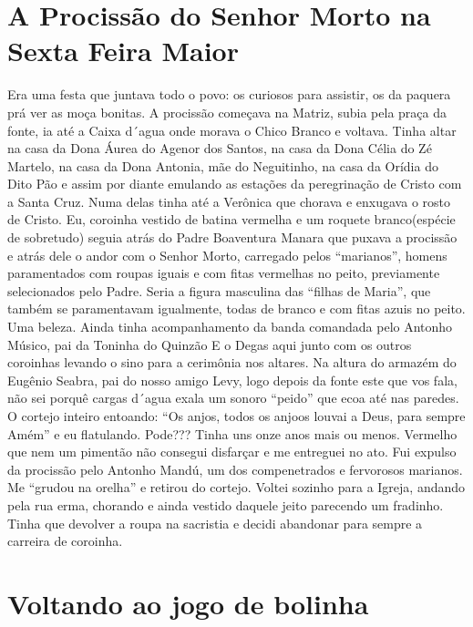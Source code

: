 \documentclass[12pt,brazil,]{book}
\begin{document}
\section{A Procissão do Senhor Morto na Sexta Feira
Maior}\label{a-procissuxe3o-do-senhor-morto-na-sexta-feira-maior}

Era uma festa que juntava todo o povo: os curiosos para assistir, os da
paquera prá ver as moça bonitas. A procissão começava na Matriz, subia
pela praça da fonte, ia até a Caixa d´agua onde morava o Chico Branco e
voltava. Tinha altar na casa da Dona Áurea do Agenor dos Santos, na casa
da Dona Célia do Zé Martelo, na casa da Dona Antonia, mãe do Neguitinho,
na casa da Orídia do Dito Pão e assim por diante emulando as estações da
peregrinação de Cristo com a Santa Cruz. Numa delas tinha até a Verônica
que chorava e enxugava o rosto de Cristo. Eu, coroinha vestido de batina
vermelha e um roquete branco(espécie de sobretudo) seguia atrás do Padre
Boaventura Manara que puxava a procissão e atrás dele o andor com o
Senhor Morto, carregado pelos ``marianos'', homens paramentados com
roupas iguais e com fitas vermelhas no peito, previamente selecionados
pelo Padre. Seria a figura masculina das ``filhas de Maria'', que também
se paramentavam igualmente, todas de branco e com fitas azuis no peito.
Uma beleza. Ainda tinha acompanhamento da banda comandada pelo Antonho
Músico, pai da Toninha do Quinzão E o Degas aqui junto com os outros
coroinhas levando o sino para a cerimônia nos altares. Na altura do
armazém do Eugênio Seabra, pai do nosso amigo Levy, logo depois da fonte
este que vos fala, não sei porquê cargas d´agua exala um sonoro
``peido'' que ecoa até nas paredes. O cortejo inteiro entoando: ``Os
anjos, todos os anjoos louvai a Deus, para sempre Amém'' e eu
flatulando. Pode??? Tinha uns onze anos mais ou menos. Vermelho que nem
um pimentão não consegui disfarçar e me entreguei no ato. Fui expulso da
procissão pelo Antonho Mandú, um dos compenetrados e fervorosos
marianos. Me ``grudou na orelha'' e retirou do cortejo. Voltei sozinho
para a Igreja, andando pela rua erma, chorando e ainda vestido daquele
jeito parecendo um fradinho. Tinha que devolver a roupa na sacristia e
decidi abandonar para sempre a carreira de coroinha.

\section{Voltando ao jogo de bolinha}\label{voltando-ao-jogo-de-bolinha}
\end{document}
